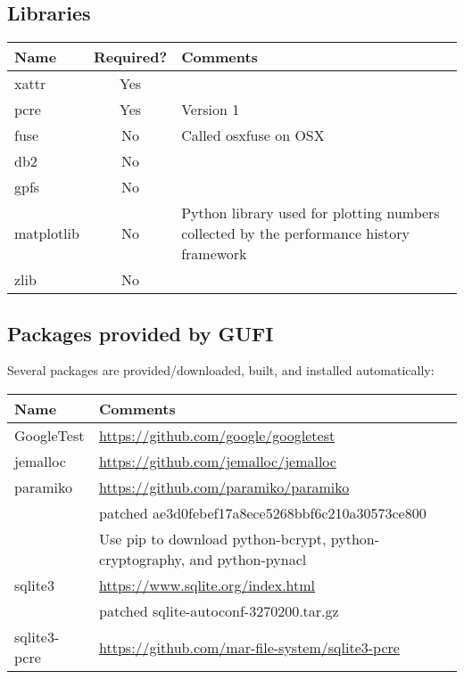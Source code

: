 \subsection{Libraries}
\begin{tabularx}{\textwidth}{| l | c | X |}
  \hline
  Name & Required? & Comments \\
  \hline
  xattr & Yes & \\
  \hline
  pcre & Yes & Version 1 \\
  \hline
  fuse & No & Called osxfuse on OSX \\
  \hline
  db2 & No & \\
  \hline
  gpfs & No & \\
  \hline
  matplotlib & No & Python library used for plotting numbers collected
  by the performance history framework \\
  \hline
  zlib & No & \\
  \hline
\end{tabularx}

\subsection{Packages provided by GUFI}
Several packages are provided/downloaded, built, and installed
automatically:
\begin{tabularx}{\textwidth}{| l | X |}
  \hline
  Name & Comments \\
  \hline
  GoogleTest & \url{https://github.com/google/googletest} \\
  \hline
  jemalloc & \url{https://github.com/jemalloc/jemalloc} \\
  \hline
  paramiko & \url{https://github.com/paramiko/paramiko} \\
  & patched ae3d0febef17a8ece5268bbf6c210a30573ce800 \\
  & Use pip to download python-bcrypt, python-cryptography, and
  python-pynacl \\
  \hline
  sqlite3 & \url{https://www.sqlite.org/index.html} \\
  & patched sqlite-autoconf-3270200.tar.gz \\
  \hline
  sqlite3-pcre & \url{https://github.com/mar-file-system/sqlite3-pcre}
  \\
  \hline
\end{tabularx}

